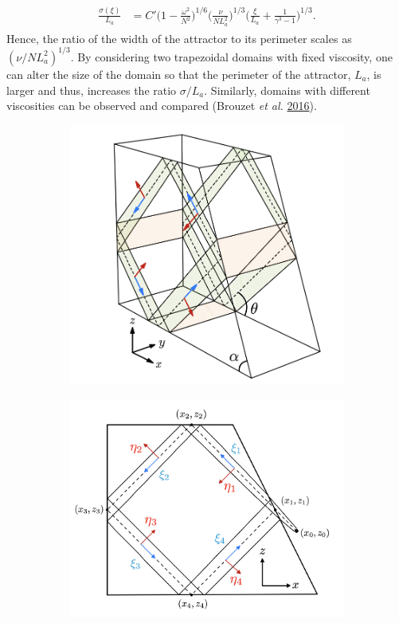 \documentclass[a4paper]{article}
\numberwithin{equation}{section}
\begin{document}
\begin{align}\label{eq:4.7}
\begin{split}
\frac{\sigma(\xi)}{L_a} &= C'\bigg(1 - \frac{\omega^2}{N^2}\bigg)^{1/6} \bigg( \frac{\nu}{N L_a^2}\bigg)^{1/3} \bigg( \frac{\xi}{L_a} + \frac{1}{\gamma^3 -1} \bigg)^{1/3}.
\end{split}
\end{align}
Hence, the ratio of the width of the attractor to its perimeter scales as $(\nu / NL_a^2)^{1/3}$. By considering two trapezoidal domains with fixed viscosity, one can alter the size of the domain so that the perimeter of the attractor, $L_a$, is larger and thus, increases the ratio $\sigma/L_a$. Similarly, domains with different viscosities can be observed and compared (Brouzet \emph{et al.} \hyperlink{ref 26}{2016}). 
\begin{figure}[h!]
\centering
\begin{subfigure}[t]{.5\textwidth}
  \centering
  \includegraphics[width=0.72\linewidth]{Images/dissipation.jpeg}
  \label{fig:sub1}
  \caption{}
\end{subfigure}%
\begin{subfigure}[t]{.5\textwidth}
  \centering
  \includegraphics[width=0.84\linewidth]{Images/dissipation 2.jpeg}

\end{subfigure}
\end{figure}
\end{document}
